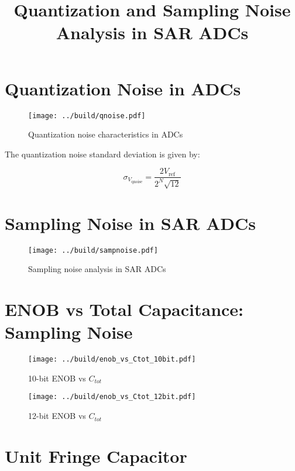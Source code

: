 \documentclass[11pt]{article}
\title{Quantization and Sampling Noise Analysis in SAR ADCs}
\author{}
\date{}
\begin{document}
\maketitle

\section{Quantization Noise in ADCs}

\begin{figure}[htbp]
  \centering
  \texttt{[image: ../build/qnoise.pdf]}
  \caption{Quantization noise characteristics in ADCs}
\end{figure}

The quantization noise standard deviation is given by:

\begin{equation}
\sigma_{V_{\mathrm{qnoise}}} = \frac{2 V_\mathrm{ref}}{2^N \sqrt{12}}
\end{equation}

\section{Sampling Noise in SAR ADCs}

\begin{figure}[htbp]
  \centering
  \texttt{[image: ../build/sampnoise.pdf]}
  \caption{Sampling noise analysis in SAR ADCs}
\end{figure}

\section{ENOB vs Total Capacitance: Sampling Noise}

\begin{figure}[htbp]
  \centering
  \begin{minipage}{0.48\textwidth}
    \centering
    \texttt{[image: ../build/enob\_vs\_Ctot\_10bit.pdf]}
    \caption{10-bit ENOB vs $C_{tot}$}
  \end{minipage}
  \hfill
  \begin{minipage}{0.48\textwidth}
    \centering
    \texttt{[image: ../build/enob\_vs\_Ctot\_12bit.pdf]}
    \caption{12-bit ENOB vs $C_{tot}$}
  \end{minipage}
\end{figure}

\section{Unit Fringe Capacitor}
\end{document}

